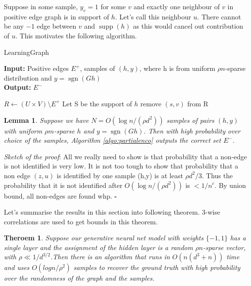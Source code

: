 \documentclass[11pt]{article}
\newcommand{\sgn}{\operatorname{sgn}}
\newcommand{\supp}{\operatorname{supp}}
\newtheorem{thm}{Theroem}
\newtheorem{lemma}{Lemma}
\begin{document}
	Suppose in some sample, $y_v = 1$ for some $v$ and exactly one neighbour of $v$ in positive edge graph is in support of $h$. Let's call this neighbour $u$. There cannot be any $-1$ edge between $v$ and $\supp(h)$ as this would cancel out contribution of $u$. This motivates the following algorithm.

	\begin{algorithm}[H]
		\caption{LearningGraph}
		\label{algo:LearningGraph}
		\textbf{Input:} Positive edges $E^+$, samples of  $(h,y)$, where h is from uniform $\rho n$-sparse distribution and $y = \sgn(Gh)$\\
		\textbf{Output:} $E^-$
		\begin{algorithmic}[1]
			\STATE $R \gets (U\times V)\setminus E^+$
			\STATE Let S be the support of $h$
			\STATE remove $(s,v)$ from R
			\ENDFOR
			\ENDIF
			\ENDFOR 
		\end{algorithmic}
	\end{algorithm}

	\begin{lemma}\label{lemma:learngraph}
		Suppose we have $ N = O(\log n/(\rho d^2))$ samples of pairs $(h,y)$ with uniform $\rho m$-sparse $h$ and $y = \sgn(Gh)$. Then with high probability over choice of the samples, Algorithm \ref{algo:partialenco} outputs the correct set $E^-$.
	\end{lemma}
	\emph{Sketch of the proof}: All we really need to show is that probability that a non-edge is not identified is very low. It is not too tough to show that probability that a non edge $(z,u)$ is identified by one sample (h,y) is at least $\rho d^2/3$. Thus the probability that it is not identified after $O(\log n/(\rho d^2))$ is $<1/n^c$. By union bound, all non-edges are found whp.
	$\square$
	
	Let's summarise the results in this section into following theorem. 3-wise correlations are used to get bounds in this theorem.
	
	\begin{thm}
	Suppose our generative neural net model with weights $\{-1, 1\}$ has a single layer and the assignment of the hidden layer is a random $\rho n$-sparse vector, with $\rho \ll 1/d^{3/2}$.Then there is an algorithm that runs in $O(n(d^3 + n))$ time and uses $O(log n/\rho^2)$ samples to recover the ground truth with high probability over the randomness of the graph and the samples.
	\end{thm}
\end{document}
